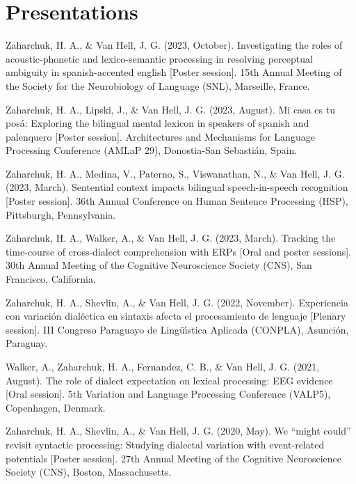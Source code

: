 \documentclass[11pt,a4paper,]{awesome-cv}
\begin{document}
\hypertarget{presentations}{%
\section{Presentations}\label{presentations}}

\hypertarget{bibliography}{}
\leavevmode{}%
Zaharchuk, H. A., \& Van Hell, J. G. (2023, October). Investigating the
roles of acoustic-phonetic and lexico-semantic processing in resolving
perceptual ambiguity in spanish-accented english {[}Poster session{]}.
15th Annual Meeting of the Society for the Neurobiology of Language
(SNL), Marseille, France.

\leavevmode{}%
Zaharchuk, H. A., Lipski, J., \& Van Hell, J. G. (2023, August). Mi casa
es tu posá: Exploring the bilingual mental lexicon in speakers of
spanish and palenquero {[}Poster session{]}. Architectures and
Mechanisms for Language Processing Conference (AMLaP 29), Donostia-San
Sebastián, Spain.

\leavevmode{}%
Zaharchuk, H. A., Medina, V., Paterno, S., Viswanathan, N., \& Van Hell,
J. G. (2023, March). Sentential context impacts bilingual
speech-in-speech recognition {[}Poster session{]}. 36th Annual
Conference on Human Sentence Processing (HSP), Pittsburgh, Pennsylvania.

\leavevmode{}%
Zaharchuk, H. A., Walker, A., \& Van Hell, J. G. (2023, March). Tracking
the time-course of cross-dialect comprehension with ERPs {[}Oral and
poster sessions{]}. 30th Annual Meeting of the Cognitive Neuroscience
Society (CNS), San Francisco, California.

\leavevmode{}%
Zaharchuk, H. A., Shevlin, A., \& Van Hell, J. G. (2022, November).
Experiencia con variación dialéctica en sintaxis afecta el procesamiento
de lenguaje {[}Plenary session{]}. III Congreso Paraguayo de Lingüı́stica
Aplicada (CONPLA), Asunción, Paraguay.

\leavevmode{}%
Walker, A., Zaharchuk, H. A., Fernandez, C. B., \& Van Hell, J. G.
(2021, August). The role of dialect expectation on lexical processing:
EEG evidence {[}Oral session{]}. 5th Variation and Language Processing
Conference (VALP5), Copenhagen, Denmark.

\leavevmode{}%
Zaharchuk, H. A., Shevlin, A., \& Van Hell, J. G. (2020, May). We
{``might could''} revisit syntactic processing: Studying dialectal
variation with event-related potentials {[}Poster session{]}. 27th
Annual Meeting of the Cognitive Neuroscience Society (CNS), Boston,
Massachusetts.
\end{document}
